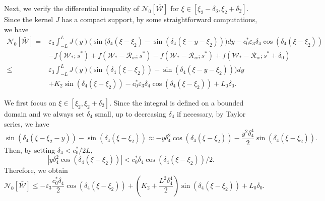 \documentclass[11pt,a4paper]{article}
\numberwithin{equation}{section}
\numberwithin{figure}{section}
\newcommand\beaa{\begin{eqnarray*}}
\newcommand\eeaa{\end{eqnarray*}}
\begin{document}
Next, we verify the differential inequality of $\mathcal{N}_0[\bar{\mathcal W}]$ for $\xi\in[\xi_2-\delta_3,\xi_2+\delta_2]$.
Since the kernel $J$ has a compact support,
by some straightforward computations, we have
\begin{equation*}
\begin{aligned}
\mathcal{N}_0[\bar{\mathcal W}]=&\varepsilon_3\int_{-L}^LJ(y)\Big(\sin(\delta_4(\xi-\xi_2)-\sin(\delta_4(\xi-y-\xi_2))\Big)dy-c_0^*\varepsilon_3\delta_4\cos(\delta_4(\xi-\xi_2))\\
&-f(\mathcal{W}_*;s^*)+f(\mathcal{W}_*-\mathcal{R}_w;s^*)-f(\mathcal{W}_*-\mathcal{R}_w;s^*)+f(\mathcal{W}_*-\mathcal{R}_w;s^*+\delta_0)\\
\le &\varepsilon_3\int_{-L}^LJ(y)\Big(\sin(\delta_4(\xi-\xi_2))-\sin(\delta_4(\xi-y-\xi_2))\Big)dy\\
&+K_2\sin(\delta_4(\xi-\xi_2))-c_0^*\varepsilon_3\delta_4\cos(\delta_4(\xi-\xi_2))+L_0\delta_0.
\end{aligned}
\end{equation*}

We first focus on $\xi\in[\xi_2,\xi_2+\delta_2]$. Since the integral is defined on a bounded domain and we always set $\delta_4$ small, up to decreasing $\delta_4$ if necessary, by Taylor series, we have
$$\sin(\delta_4(\xi-\xi_2-y))-\sin(\delta_4(\xi-\xi_2))\approx-y\delta_4^2\cos(\delta_4(\xi-\xi_2))-\frac{y^2\delta_4^4}{2}\sin(\delta_4(\xi-\xi_2)).$$
Then, by setting $\delta_4<c_0^*/2L$,
\begin{equation}\label{inequilty 1}
|y\delta_4^2\cos(\delta_4(\xi-\xi_2))|<c_0^*\delta_4\cos(\delta_4(\xi-\xi_2))/2.
\end{equation}
Therefore, we obtain
\begin{equation}\label{inequality 2}
\mathcal{N}_0[\bar{\mathcal W}]\le -\varepsilon_3\frac{c_0^*\delta_4}{2}\cos(\delta_4(\xi-\xi_2))+(K_2+\frac{L^2\delta_4^4}{2})\sin(\delta_4(\xi-\xi_2))+L_0\delta_0.
\end{equation}
\end{document}
